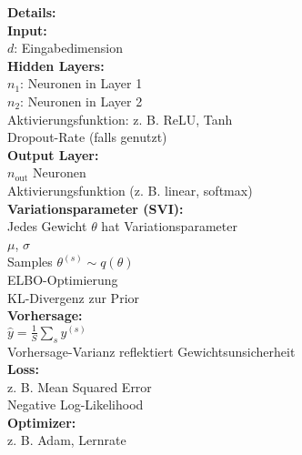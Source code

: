 \begin{center}
\begin{minipage}[t]{0.47\textwidth}
{
}
\end{minipage}%
\hfill
\begin{minipage}[t]{0.48\textwidth}
\raggedright
\small
\textbf{Details:} \\[6pt]

\textbf{Input:} \\
$d$: Eingabedimension \\[4pt]

\textbf{Hidden Layers:} \\
$n_1$: Neuronen in Layer 1 \\
$n_2$: Neuronen in Layer 2 \\
Aktivierungsfunktion: z. B. ReLU, Tanh \\
Dropout-Rate (falls genutzt) \\[4pt]

\textbf{Output Layer:} \\
$n_\text{out}$ Neuronen \\
Aktivierungsfunktion (z. B. linear, softmax) \\[4pt]

\textbf{Variationsparameter (SVI):} \\
Jedes Gewicht $\theta$ hat Variationsparameter \\
$\mu$, $\sigma$ \\
Samples $\theta^{(s)} \sim q(\theta)$ \\
ELBO-Optimierung \\
KL-Divergenz zur Prior \\[4pt]

\textbf{Vorhersage:} \\
$\hat{y} = \frac{1}{S} \sum_s y^{(s)}$ \\
Vorhersage-Varianz reflektiert Gewichtsunsicherheit \\[4pt]

\textbf{Loss:} \\
z. B. Mean Squared Error \\
Negative Log-Likelihood \\[4pt]

\textbf{Optimizer:} \\
z. B. Adam, Lernrate
\end{minipage}
\end{center}




